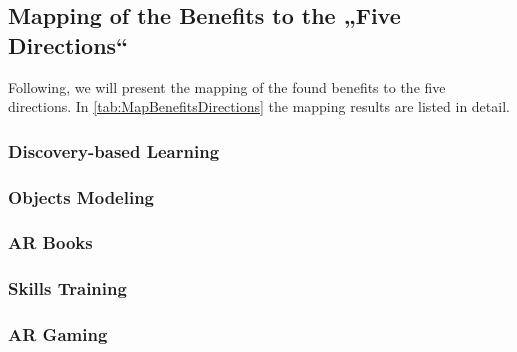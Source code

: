 \subsection{Mapping of the Benefits to the „Five Directions“}
\label{subsec:Mapping}
Following, we will present the mapping of the found benefits to the five directions. In \ref{tab:MapBenefitsDirections} the mapping results are listed in detail. 
\subsubsection{Discovery-based Learning}

\subsubsection{Objects Modeling}
\subsubsection{AR Books}
\subsubsection{Skills Training}
\subsubsection{AR Gaming}


